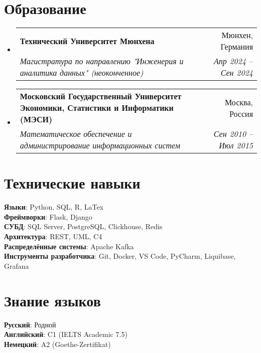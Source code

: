 \documentclass[letterpaper,11pt,english,russian]{article}
\newcommand{\resumeSubheading}[4]{
  \vspace{-2pt}\item
    \begin{tabularx}{0.95\textwidth}[t]{X r}
      \textbf{#1} & #2 \\
      \textit{\small #3} & \textit{\small #4} \\
    \end{tabularx}\vspace{-7pt}
}
\newcommand{\resumeSubHeadingListStart}{\begin{itemize}[leftmargin=0.15in, label={}]}
\newcommand{\resumeSubHeadingListEnd}{\end{itemize}}
\begin{document}
\section{Образование}
  \resumeSubHeadingListStart
    \resumeSubheading
      {Технический Университет Мюнхена}{Мюнхен, Германия}
      {Магистратура по направлению "Инженерия и аналитика данных" (неоконченное)}{Апр 2024 -- Сен 2024}
    \resumeSubheading
      {Московский Государственный Университет Экономики, Статистики и Информатики (МЭСИ)}{Москва, Россия}
      {Математическое обеспечение и администрирование информационных систем}{Сен 2010 -- Июл 2015}
  \resumeSubHeadingListEnd


%
\section{Технические навыки}
 \begin{itemize}[leftmargin=0.15in, label={}]
    \small{\item{
     \textbf{Языки}{: Python, SQL, R, LaTex} \\
     \textbf{Фреймворки}{: Flask, Django} \\
     \textbf{СУБД}{: SQL Server, PostgreSQL, Clickhouse, Redis} \\
     \textbf{Архитектура}{: REST, UML, C4}\\
     \textbf{Распределённые системы}{: Apache Kafka} \\
     \textbf{Инструменты разработчика}{: Git, Docker, VS Code, PyCharm, Liquibase, Grafana}
    }}
 \end{itemize}

%
\section{Знание языков}
 \begin{itemize}[leftmargin=0.15in, label={}]
    \small{\item{
     \textbf{Русский}{: Родной} \\
     \textbf{Английский}{: C1 (IELTS Academic 7.5)} \\
     \textbf{Немецкий}{: A2 (Goethe-Zertifikat)}
    }}
 \end{itemize}

\end{document}
